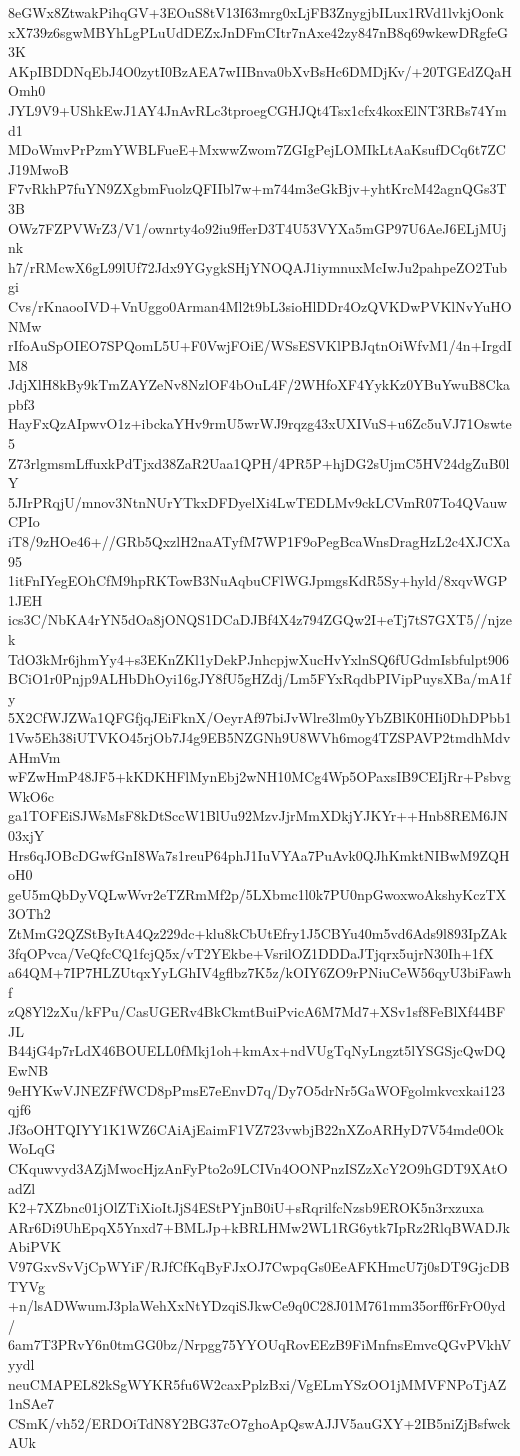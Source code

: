 8eGWx8ZtwakPihqGV+3EOuS8tV13I63mrg0xLjFB3ZnygjbILux1RVd1lvkjOonk
xX739z6sgwMBYhLgPLuUdDEZxJnDFmCItr7nAxe42zy847nB8q69wkewDRgfeG3K
AKpIBDDNqEbJ4O0zytI0BzAEA7wIIBnva0bXvBsHc6DMDjKv/+20TGEdZQaHOmh0
JYL9V9+UShkEwJ1AY4JnAvRLc3tproegCGHJQt4Tsx1cfx4koxElNT3RBs74Ymd1
MDoWmvPrPzmYWBLFueE+MxwwZwom7ZGIgPejLOMIkLtAaKsufDCq6t7ZCJ19MwoB
F7vRkhP7fuYN9ZXgbmFuolzQFIIbl7w+m744m3eGkBjv+yhtKrcM42agnQGs3T3B
OWz7FZPVWrZ3/V1/ownrty4o92iu9fferD3T4U53VYXa5mGP97U6AeJ6ELjMUjnk
h7/rRMcwX6gL99lUf72Jdx9YGygkSHjYNOQAJ1iymnuxMcIwJu2pahpeZO2Tubgi
Cvs/rKnaooIVD+VnUggo0Arman4Ml2t9bL3sioHlDDr4OzQVKDwPVKlNvYuHONMw
rIfoAuSpOIEO7SPQomL5U+F0VwjFOiE/WSsESVKlPBJqtnOiWfvM1/4n+IrgdIM8
JdjXlH8kBy9kTmZAYZeNv8NzlOF4bOuL4F/2WHfoXF4YykKz0YBuYwuB8Ckapbf3
HayFxQzAIpwvO1z+ibckaYHv9rmU5wrWJ9rqzg43xUXIVuS+u6Zc5uVJ71Oswte5
Z73rlgmsmLffuxkPdTjxd38ZaR2Uaa1QPH/4PR5P+hjDG2sUjmC5HV24dgZuB0lY
5JIrPRqjU/mnov3NtnNUrYTkxDFDyelXi4LwTEDLMv9ckLCVmR07To4QVauwCPIo
iT8/9zHOe46+//GRb5QxzlH2naATyfM7WP1F9oPegBcaWnsDragHzL2c4XJCXa95
1itFnIYegEOhCfM9hpRKTowB3NuAqbuCFlWGJpmgsKdR5Sy+hyld/8xqvWGP1JEH
ics3C/NbKA4rYN5dOa8jONQS1DCaDJBf4X4z794ZGQw2I+eTj7tS7GXT5//njzek
TdO3kMr6jhmYy4+s3EKnZKl1yDekPJnhcpjwXucHvYxlnSQ6fUGdmIsbfulpt906
BCiO1r0Pnjp9ALHbDhOyi16gJY8fU5gHZdj/Lm5FYxRqdbPIVipPuysXBa/mA1fy
5X2CfWJZWa1QFGfjqJEiFknX/OeyrAf97biJvWlre3lm0yYbZBlK0HIi0DhDPbb1
1Vw5Eh38iUTVKO45rjOb7J4g9EB5NZGNh9U8WVh6mog4TZSPAVP2tmdhMdvAHmVm
wFZwHmP48JF5+kKDKHFlMynEbj2wNH10MCg4Wp5OPaxsIB9CEIjRr+PsbvgWkO6c
ga1TOFEiSJWsMsF8kDtSccW1BlUu92MzvJjrMmXDkjYJKYr++Hnb8REM6JN03xjY
Hrs6qJOBcDGwfGnI8Wa7s1reuP64phJ1IuVYAa7PuAvk0QJhKmktNIBwM9ZQHoH0
geU5mQbDyVQLwWvr2eTZRmMf2p/5LXbmc1l0k7PU0npGwoxwoAkshyKczTX3OTh2
ZtMmG2QZStByItA4Qz229dc+klu8kCbUtEfry1J5CBYu40m5vd6Ads9l893IpZAk
3fqOPvca/VeQfcCQ1fcjQ5x/vT2YEkbe+VsrilOZ1DDDaJTjqrx5ujrN30Ih+1fX
a64QM+7IP7HLZUtqxYyLGhIV4gflbz7K5z/kOIY6ZO9rPNiuCeW56qyU3biFawhf
zQ8Yl2zXu/kFPu/CasUGERv4BkCkmtBuiPvicA6M7Md7+XSv1sf8FeBlXf44BFJL
B44jG4p7rLdX46BOUELL0fMkj1oh+kmAx+ndVUgTqNyLngzt5lYSGSjcQwDQEwNB
9eHYKwVJNEZFfWCD8pPmsE7eEnvD7q/Dy7O5drNr5GaWOFgolmkvcxkai123qjf6
Jf3oOHTQIYY1K1WZ6CAiAjEaimF1VZ723vwbjB22nXZoARHyD7V54mde0OkWoLqG
CKquwvyd3AZjMwocHjzAnFyPto2o9LCIVn4OONPnzISZzXcY2O9hGDT9XAtOadZl
K2+7XZbnc01jOlZTiXioItJjS4EStPYjnB0iU+sRqrilfcNzsb9EROK5n3rxzuxa
ARr6Di9UhEpqX5Ynxd7+BMLJp+kBRLHMw2WL1RG6ytk7IpRz2RlqBWADJkAbiPVK
V97GxvSvVjCpWYiF/RJfCfKqByFJxOJ7CwpqGs0EeAFKHmcU7j0sDT9GjcDBTYVg
+n/lsADWwumJ3plaWehXxNtYDzqiSJkwCe9q0C28J01M761mm35orff6rFrO0yd/
6am7T3PRvY6n0tmGG0bz/Nrpgg75YYOUqRovEEzB9FiMnfnsEmvcQGvPVkhVyydl
neuCMAPEL82kSgWYKR5fu6W2caxPplzBxi/VgELmYSzOO1jMMVFNPoTjAZ1nSAe7
CSmK/vh52/ERDOiTdN8Y2BG37cO7ghoApQswAJJV5auGXY+2IB5niZjBsfwckAUk
